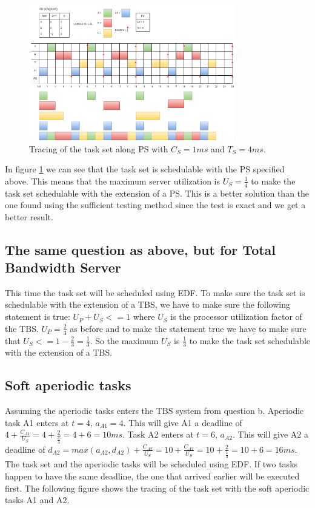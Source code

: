         \begin{figure}[H]
            \centering
            \includegraphics[width=0.8\textwidth]{images/Ass1Q8aPS.png}
            \caption{Tracing of the task set along PS with $C_S = 1ms$ and $T_S = 4ms$.}
            \label{fig:Q8PStrace}
        \end{figure} 

        In figure \ref{fig:Q8PStrace} we can see that the task set is schedulable with the PS specified above. This means that the maximum server utilization is $U_S = \frac{1}{4}$ to make the task set schedulable with the extension of a PS. This is a better solution than the one found using the sufficient testing method since the test is exact and we get a better result.

    \subsection{\textbf{The same question as above, but for Total Bandwidth Server}}
        
        This time the task set will be scheduled using EDF. To make sure the task set is schedulable with the extension of a TBS, we have to make sure the following statement is true: $U_P + U_S <= 1$ where $U_S$ is the processor utilization factor of the TBS. $U_P = \frac{2}{3}$ as before and to make the statement true we have to make sure that $U_S <= 1 - \frac{2}{3} = \frac{1}{3}$. So the maximum $U_S$ is $\frac{1}{3}$ to make the task set schedulable with the extension of a TBS.

    \subsection{\textbf{Soft aperiodic tasks}}

        Assuming the aperiodic tasks enters the TBS system from question b. Aperiodic task A1 enters at $t=4$, $a_{A1} = 4$. This will give A1 a deadline of $4 + \frac{C_{A1}}{U_S} = 4 + \frac{2}{\frac{1}{3}} = 4 + 6 = 10ms$. Task A2 enters at $t=6$, $a_{A2}$. This will give A2 a deadline of $d_{A2} = max(a_{A2}, d_{A2}) + \frac{C_{A2}}{U_S} = 10 + \frac{C_{A2}}{U_S} = 10 + \frac{2}{\frac{1}{3}} = 10 + 6 = 16ms$. The task set and the aperiodic tasks will be scheduled using EDF. If two tasks happen to have the same deadline, the one that arrived earlier will be executed first. The following figure shows the tracing of the task set with the soft aperiodic tasks A1 and A2.

